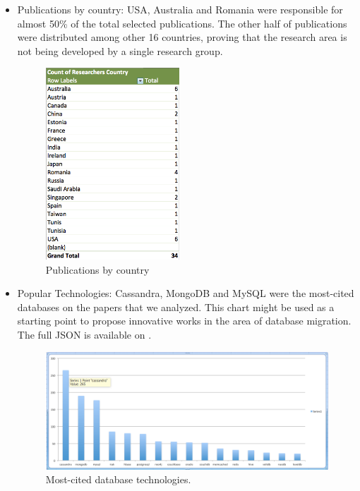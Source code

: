 \documentclass{article}
\begin{document}
\begin{itemize}
\item{Publications by country: }
USA, Australia and Romania were responsible for almost 50\% of the total selected publications. The other half of publications were distributed among other 16 countries, proving that the research area is not being developed by a single research group. 
\begin{figure}[htb!]
\centering
\includegraphics[width=50mm]{graph3.png}
\caption{Publications by country}
\end{figure}



\item{Popular Technologies: }
Cassandra, MongoDB and MySQL were the most-cited databases on the papers that we analyzed. This chart might be used as a starting point to propose innovative works in the area of database migration. The full JSON is available on \cite{fullDBJson}.
\begin{figure}[htb!]
\centering
\includegraphics[width=150mm]{database_count.png}
\caption{Most-cited database technologies.}
\end{figure}


\end{itemize}
\end{document}
